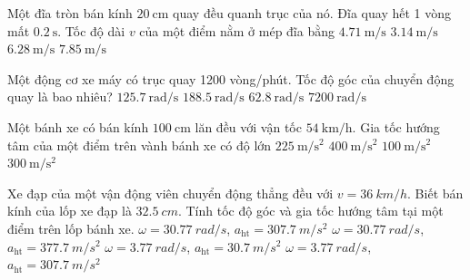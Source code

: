 \begin{ex}
	Một đĩa tròn bán kính $\SI{20}{\centi\meter}$ quay đều quanh trục của nó. Đĩa quay hết 1 vòng mất $\SI{0.2}{\second}$. Tốc độ dài $v$ của một điểm nằm ở mép đĩa bằng
	\choice
	{$\SI{4,71}{\meter/\second}$}
	{$\SI{3,14}{\meter/\second}$}
	{\True $\SI{6,28}{\meter/\second}$}
	{$\SI{7,85}{\meter/\second}$}
\end{ex}
\begin{ex}
	Một động cơ xe máy có trục quay 1200 vòng/phút. Tốc độ góc của chuyển động quay là bao nhiêu?	
	\choice
	{\True $\SI{125,7}{\radian/\second}$}
	{$\SI{188,5}{\radian/\second}$}
	{$\SI{62,8}{\radian/\second}$}
	{$\SI{7200}{\radian/\second}$}
\end{ex}
\begin{ex}
Một bánh xe có bán kính $\SI{100}{\centi\meter}$ lăn đều với vận tốc $\SI{54}{\kilo\meter/\hour}$. Gia tốc hướng tâm của một điểm trên vành bánh xe có độ lớn	
	\choice
	{\True $\SI{225}{\meter/\second^2}$}
	{$\SI{400}{\meter/\second^2}$}
	{$\SI{100}{\meter/\second^2}$}
	{$\SI{300}{\meter/\second^2}$}
\end{ex}
\begin{ex}
	Xe đạp của một vận động viên chuyển động thẳng đều với $v=\SI{36}{km/h}$. Biết bán kính của lốp xe đạp là $\SI{32.5}{cm}$. Tính tốc độ góc và gia tốc hướng tâm tại một điểm trên lốp bánh xe.
	\choice
	{\True $\omega = \SI{30.77}{rad/s}$, $a_\text{ht} = \SI{307.7}{m/s^2}$}
	{$\omega = \SI{30.77}{rad/s}$, $a_\text{ht} = \SI{377.7}{m/s^2}$}
	{$\omega = \SI{3.77}{rad/s}$, $a_\text{ht} = \SI{30.7}{m/s^2}$}
	{$\omega = \SI{3.77}{rad/s}$, $a_\text{ht} = \SI{307.7}{m/s^2}$}
\end{ex}
